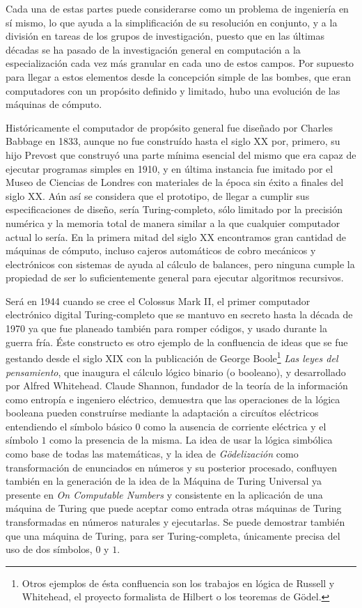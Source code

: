 \documentclass[12pt]{memoir}
\begin{document}
Cada una de estas partes puede considerarse como un problema de ingeniería en sí mismo, lo que ayuda a la simplificación de su resolución en conjunto, y a la división en tareas de los grupos de investigación, puesto que en las últimas décadas se ha pasado de la investigación general en computación a la especialización cada vez más granular en cada uno de estos campos. Por supuesto para llegar a estos elementos desde la concepción simple de las bombes, que eran computadores con un propósito definido y limitado, hubo una evolución de las máquinas de cómputo.

\nocite{wiki:computerhistory}

Históricamente el computador de propósito general fue diseñado por Charles Babbage en 1833, aunque no fue construído hasta el siglo XX por, primero, su hijo Prevost que construyó una parte mínima esencial del mismo que era capaz de ejecutar programas simples en 1910, y en última instancia fue imitado por el Museo de Ciencias de Londres con materiales de la época sin éxito a finales del siglo XX. Aún así se considera que el prototipo, de llegar a cumplir sus especificaciones de diseño, sería Turing-completo, sólo limitado por la precisión numérica y la memoria total de manera similar a la que cualquier computador actual lo sería. En la primera mitad del siglo XX encontramos gran cantidad de máquinas de cómputo, incluso cajeros automáticos de cobro mecánicos y electrónicos con sistemas de ayuda al cálculo de balances, pero ninguna cumple la propiedad de ser lo suficientemente general para ejecutar algoritmos recursivos.

Será en 1944 cuando se cree el Colossus Mark II, el primer computador electrónico digital Turing-completo que se mantuvo en secreto hasta la década de 1970 ya que fue planeado también para romper códigos, y usado durante la guerra fría. Éste constructo es otro ejemplo de la confluencia de ideas que se fue gestando desde el siglo XIX con la publicación de George Boole\footnote{Otros ejemplos de ésta confluencia son los trabajos en lógica de Russell y Whitehead, el proyecto formalista de Hilbert o los teoremas de Gödel.} \textit{Las leyes del pensamiento}, que inaugura el cálculo lógico binario (o booleano), y desarrollado por Alfred Whitehead. Claude Shannon, fundador de la teoría de la información como entropía e ingeniero eléctrico, demuestra que las operaciones de la lógica booleana pueden construírse mediante la adaptación a circuítos eléctricos entendiendo el símbolo básico $0$ como la ausencia de corriente eléctrica y el símbolo $1$ como la presencia de la misma. La idea de usar la lógica simbólica como base de todas las matemáticas, y la idea de \textit{Gödelización} como transformación de enunciados en números y su posterior procesado, confluyen también en la generación de la idea de la Máquina de Turing Universal ya presente en \textit{On Computable Numbers} y consistente en la aplicación de una máquina de Turing que puede aceptar como entrada otras máquinas de Turing transformadas en números naturales y ejecutarlas. Se puede demostrar también que una máquina de Turing, para ser Turing-completa, únicamente precisa del uso de dos símbolos, $0$ y $1$. 
\end{document}
